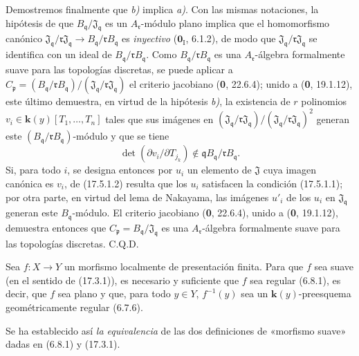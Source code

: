 Demostremos finalmente que \emph{b)} implica \emph{a)}. Con las mismas notaciones, la hipótesis de que $B_{\mathfrak q}/\mathfrak J_{\mathfrak q}$ es un $A_{\mathfrak r}$-módulo plano implica que el homomorfismo canónico $\mathfrak J_{\mathfrak q}/\mathfrak r\mathfrak J_{\mathfrak q}\to B_{\mathfrak q}/\mathfrak rB_{\mathfrak q}$ es \emph{inyectivo} ($\mathbf{0}_{\mathrm I}$, 6.1.2), de modo que $\mathfrak J_{\mathfrak q}/\mathfrak r\mathfrak J_{\mathfrak q}$ se identifica con un ideal de $B_{\mathfrak q}/\mathfrak rB_{\mathfrak q}$. Como $B_{\mathfrak q}/\mathfrak rB_{\mathfrak q}$ es una $A_{\mathfrak r}$-álgebra formalmente suave para las topologías discretas, se puede aplicar a $C_{\mathfrak p}=(B_{\mathfrak q}/\mathfrak rB_{\mathfrak q})/(\mathfrak J_{\mathfrak q}/\mathfrak r\mathfrak J_{\mathfrak q})$ el criterio jacobiano (\textbf 0, 22.6.4); unido a (\textbf 0, 19.1.12), este último demuestra, en virtud de la hipótesis \emph{b)}, la existencia de $r$ polinomios $v_i\in\boldsymbol{k}(y)[T_1,\ldots,T_n]$ tales que sus imágenes en $(\mathfrak J_{\mathfrak q}/\mathfrak r\mathfrak J_{\mathfrak q})/(\mathfrak J_{\mathfrak q}/\mathfrak r\mathfrak J_{\mathfrak q})^2$ generan este $(B_{\mathfrak q}/\mathfrak rB_{\mathfrak q})$-módulo y que se tiene
\[
\label{IV.17.5.1.2}
\det(\partial v_i/\partial T_{j_k})\notin\mathfrak qB_{\mathfrak q}/\mathfrak rB_{\mathfrak q}.
\tag{17.5.1.2}
\]
Si, para todo $i$, se designa entonces por $u_i$ un elemento de $\mathfrak J$ cuya imagen canónica es $v_i$, de (17.5.1.2) resulta que los $u_i$ satisfacen la condición (17.5.1.1); por otra parte, en virtud del lema de Nakayama, las imágenes $u'_i$ de los $u_i$ en $\mathfrak J_{\mathfrak q}$ generan este $B_{\mathfrak q}$-módulo. El criterio jacobiano (\textbf 0, 22.6.4), unido a (\textbf 0, 19.1.12), demuestra entonces que $C_{\mathfrak p}=B_{\mathfrak q}/\mathfrak J_{\mathfrak q}$ es una $A_{\mathfrak r}$-álgebra formalmente suave para las topologías discretas. C.Q.D.

\begin{corollary}[17.5.2]
\label{IV.17.5.2}
Sea $f:X\to Y$ un morfismo localmente de presentación finita. Para que $f$ sea suave \textup{(}en el sentido de \textup{(17.3.1))}, es necesario y suficiente que $f$ sea regular \textup{(6.8.1)}, es decir, que $f$ sea plano y que, para todo $y\in Y$, $f^{-1}(y)$ sea un $\boldsymbol{k}(y)$-preesquema geométricamente regular \textup{(6.7.6)}.
\end{corollary}

Se ha establecido así \emph{la equivalencia} de las dos definiciones de «morfismo suave» dadas en (6.8.1) y (17.3.1).

